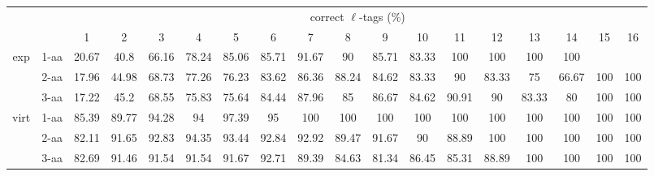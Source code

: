 \documentclass{article}[12pt]
\begin{document}
\begin{landscape}
\begin{table}[h]\tiny
\vspace{3mm}
{\centering
\begin{center}
\begin{tabular}{|c|l|c|c|c|c|c|c|c|c|c|c|c|c|c|c|c|c|}
  \hline
  \multicolumn{2}{|c|}{ } & \multicolumn{ 16 }{|c|}{ correct $\ell$-tags (\%)} \\
  \cline{3- 18}
  \multicolumn{2}{|c|}{ }  & 1 & 2 & 3 & 4 & 5 & 6 & 7 & 8 & 9 & 10 & 11 & 12 & 13 & 14 & 15 & 16\\
  \hline
  \multirow{3}{*}{exp}
&  1-aa  & 20.67 & 40.8 & 66.16 & 78.24 & 85.06 & 85.71 & 91.67 & 90 & 85.71 & 83.33 & 100 & 100 & 100 & 100 &  & \\
&  2-aa  & 17.96 & 44.98 & 68.73 & 77.26 & 76.23 & 83.62 & 86.36 & 88.24 & 84.62 & 83.33 & 90 & 83.33 & 75 & 66.67 & 100 & 100\\
&  3-aa  & 17.22 & 45.2 & 68.55 & 75.83 & 75.64 & 84.44 & 87.96 & 85 & 86.67 & 84.62 & 90.91 & 90 & 83.33 & 80 & 100 & 100\\
 \hline
  \multirow{3}{*}{virt} 
&  1-aa  & 85.39 & 89.77 & 94.28 & 94 & 97.39 & 95 & 100 & 100 & 100 & 100 & 100 & 100 & 100 & 100 & 100 & 100\\
&  2-aa  & 82.11 & 91.65 & 92.83 & 94.35 & 93.44 & 92.84 & 92.92 & 89.47 & 91.67 & 90 & 88.89 & 100 & 100 & 100 & 100 & 100\\
&  3-aa  & 82.69 & 91.46 & 91.54 & 91.54 & 91.67 & 92.71 & 89.39 & 84.63 & 81.34 & 86.45 & 85.31 & 88.89 & 100 & 100 & 100 & 100\\
 \hline
\end{tabular}
\end{center}
\par}
\centering
\vspace{3mm}
\end{table}


\end{landscape}
\end{document}
